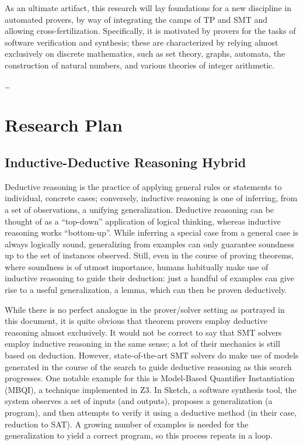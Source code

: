 As an ultimate artifact, this research will lay foundations for a new discipline
in automated provers, by way of integrating the camps of TP and SMT and allowing
cross-fertilization.
Specifically, it is motivated by provers for the tasks of software verification
and synthesis; these are characterized by relying almost exclusively on discrete
mathematics, such as set theory, graphs, automata, the construction of
natural numbers, and various theories of integer arithmetic.

\ldots


\section{Research Plan}

\subsection{Inductive-Deductive Reasoning Hybrid}

Deductive reasoning is the practice of applying general rules or statements to
individual, concrete cases; conversely, inductive reasoning is one of inferring,
from a set of observations, a unifying generalization.
Deductive reasoning can be thought of as a ``top-down'' application of logical
thinking, whereas inductive reasoning works ``bottom-up''.
While inferring a special case from a general case is always logically sound,
generalizing from examples can only guarantee soundness up to the set of
instances observed.
Still, even in the course of proving theorems, where soundness is of utmost
importance, humans habitually make use of inductive reasoning to guide their
deduction:
just a handful of examples can give rise to a useful generalization, a lemma,
which can then be proven deductively.

While there is no perfect analogue in the prover/solver setting as portrayed
in this document, it is quite obvious that theorem provers employ deductive
reasoning almost exclusively.
It would not be correct to say that SMT solvers employ inductive reasoning in
the same sense; a lot of their mechanics is still based on deduction.
However, state-of-the-art SMT solvers do make use of models generated in the
course of the search to guide deductive reasoning as this search progresses.
One notable example for this is Model-Based Quantifier Instantiation (MBQI),
a technique implemented in Z3.
In Sketch, a software synthesis tool, the system observes a set of inputs (and
outputs), proposes a generalization (a program), and then attempts to verify it
using a deductive method (in their case, reduction to SAT).
A growing number of examples is needed for the generalization to yield a correct
program, so this process repeats in a loop.

